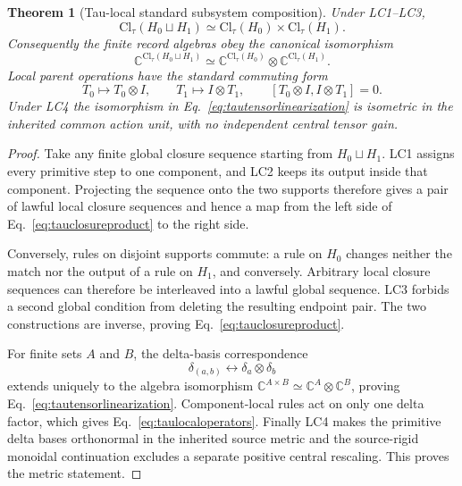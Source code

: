 \documentclass[11pt]{article}
\newtheorem{theorem}{Theorem}
\begin{document}
\begin{theorem}[Tau-local standard subsystem composition]
\label{thm:taustandardcomposition}
Under LC1--LC3,
\begin{equation}
 \boxed{
 \mathrm{Cl}_\tau(H_0\sqcup H_1)
 \simeq
 \mathrm{Cl}_\tau(H_0)\times\mathrm{Cl}_\tau(H_1).}
 \label{eq:tauclosureproduct}
\end{equation}
Consequently the finite record algebras obey the canonical isomorphism
\begin{equation}
 \boxed{
 \mathbb C^{\mathrm{Cl}_\tau(H_0\sqcup H_1)}
 \simeq
 \mathbb C^{\mathrm{Cl}_\tau(H_0)}
 \otimes
 \mathbb C^{\mathrm{Cl}_\tau(H_1)}.}
 \label{eq:tautensorlinearization}
\end{equation}
Local parent operations have the standard commuting form
\begin{equation}
 T_0\longmapsto T_0\otimes I,\qquad
 T_1\longmapsto I\otimes T_1,\qquad
 [T_0\otimes I,I\otimes T_1]=0.
 \label{eq:taulocaloperators}
\end{equation}
Under LC4 the isomorphism in
Eq.~\eqref{eq:tautensorlinearization} is isometric in the inherited common
action unit, with no independent central tensor gain.
\end{theorem}

\begin{proof}
Take any finite global closure sequence starting from $H_0\sqcup H_1$.
LC1 assigns every primitive step to one component, and LC2 keeps its output
inside that component.  Projecting the sequence onto the two supports
therefore gives a pair of lawful local closure sequences and hence a map from
the left side of Eq.~\eqref{eq:tauclosureproduct} to the right side.

Conversely, rules on disjoint supports commute: a rule on $H_0$ changes
neither the match nor the output of a rule on $H_1$, and conversely.
Arbitrary local closure sequences can therefore be interleaved into a lawful
global sequence.  LC3 forbids a second global condition from deleting the
resulting endpoint pair.  The two constructions are inverse, proving
Eq.~\eqref{eq:tauclosureproduct}.

For finite sets $A$ and $B$, the delta-basis correspondence
\begin{equation}
 \delta_{(a,b)}\longleftrightarrow\delta_a\otimes\delta_b
 \label{eq:taudeltatensor}
\end{equation}
extends uniquely to the algebra isomorphism
$\mathbb C^{A\times B}\simeq\mathbb C^A\otimes\mathbb C^B$, proving
Eq.~\eqref{eq:tautensorlinearization}.  Component-local rules act on only one
delta factor, which gives Eq.~\eqref{eq:taulocaloperators}.  Finally LC4 makes
the primitive delta bases orthonormal in the inherited source metric and the
source-rigid monoidal continuation excludes a separate positive central
rescaling.  This proves the metric statement.
\end{proof}
\end{document}
